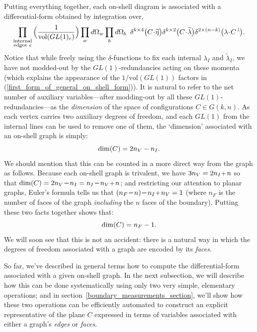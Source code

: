 \documentclass[12pt,hyperref,compress]{JHEP3}
\newcommand{\eq}[1]{\begin{equation}#1\end{equation}}
\newcommand{\mi}{{\rm\rule[2.4pt]{6pt}{0.65pt}}}
\newcommand{\pl}{\hspace{0.5pt}\text{{\small+}}\hspace{-0.5pt}}
\begin{document}
Putting everything together, each on-shell diagram is associated with a differential-form obtained by integration over,
\vspace{-.1cm}\eq{\prod_{\substack{\mathrm{internal}\\\mathrm{edges~}e}}\Big(\frac{1}{{\rm vol}(GL(1)_e)}\Big) \prod_w d \Omega_w \prod_b d \Omega_b\;\;\delta^{k\times4}\big(C\!\cdot\!\widetilde \eta\big)\delta^{k\times2}\big(C\!\cdot\!\widetilde \lambda\big)\delta^{2\times(n-k)}\big(\lambda\!\cdot \!C^\perp\!\big). \vspace{-.4cm}\label{first_form_of_general_on_shell_form}}
Notice that while freely using the $\delta$-functions to fix each internal $\lambda_I$ and $\widetilde\lambda_I$, we have not modded-out by the $GL(1)$-redundancies acting on these momenta (which explains the appearance of the $1/\mathrm{vol}(GL(1))$ factors in (\ref{first_form_of_general_on_shell_form})). It is natural to refer to the net number of auxiliary variables---after modding-out by all these $GL(1)$-redundancies---as the {\it dimension} of the space of configurations $C\!\in\!G(k,n)$. As each vertex carries two auxiliary degrees of freedom, and each $GL(1)$ from the internal lines  can be used to remove one of them, the `dimension' associated with an on-shell graph is simply:
\vspace{-.2cm}\eq{\dim(C)=2n_V-n_I.\vspace{-.2cm}}
We should mention that this can be counted in a more direct way from the graph as follows. Because each on-shell graph is trivalent, we have \mbox{$3n_V=2n_I\pl\,n$} so that \mbox{$\dim(C)=2n_V\,\mi\,n_I=n_I\,\mi\,n_V\pl\,n$}; and restricting our attention to planar graphs, Euler's formula tells us that $(n_F\,\mi\,n)\,\mi\,n_I\pl\,n_V=1$ (where $n_F$ is the number of faces of the graph {\it including} the $n$ faces of the boundary). Putting these two facts together shows that:
\vspace{-.2cm}\eq{\dim(C)=n_F-1.\vspace{-.2cm}}
We will soon see that this is not an accident: there is a natural way in which the degrees of freedom associated with a graph are encoded by its {\it faces}.

So far, we've described in general terms how to compute the differential-form associated with a given on-shell graph. In the next subsection, we will describe how this can be done systematically using only two very simple, elementary operations; and in \mbox{section \ref{boundary_measurements_section}}, we'll show how these two operations can be efficiently automated to construct an explicit representative of the plane $C$ expressed in terms of variables associated with either a graph's {\it edges} or {\it faces}.
\end{document}
